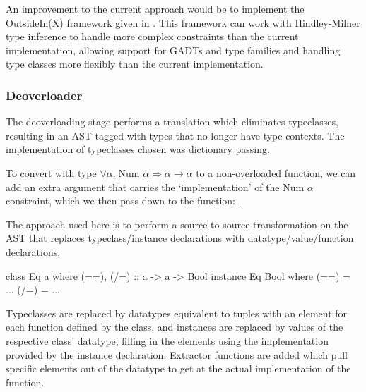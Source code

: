 \documentclass[dissertation.tex]{subfiles}
\begin{document}
{{{            An improvement to the current approach would be to implement the OutsideIn(X) framework given in
            \cite{OutsideIn}. This framework can work with Hindley-Milner type inference to handle more complex
            constraints than the current implementation, allowing support for GADTs and type families and handling type
            classes more flexibly than the current implementation.

        }
        \subsubsection{Deoverloader}\label{sec:deoverloading}
        {

            The deoverloading stage performs a translation which eliminates typeclasses, resulting in an AST tagged with
            types that no longer have type contexts. The implementation of typeclasses chosen was dictionary passing.

            To convert  with type \(\forall \alpha.\; \text{Num }\alpha \Rightarrow
            \alpha\rightarrow\alpha\) to a non-overloaded function, we can add an extra argument that carries the
            `implementation' of the \(\text{Num }\alpha\) constraint, which we then pass down to the \haskell{+}
            function: .


            The approach used here is to perform a source-to-source transformation on the AST that replaces
            typeclass/instance declarations with datatype/value/function declarations.

            \begin{haskellfigure}
            class Eq a where
                (==), (/=) :: a -> a -> Bool
            instance Eq Bool where
                (==) = ...
                (/=) = ...
            \end{haskellfigure}

            Typeclasses are replaced by datatypes equivalent to tuples with an element for each function defined by the
            class, and instances are replaced by values of the respective class' datatype, filling in the elements using
            the implementation provided by the instance declaration. Extractor functions are added which pull specific
            elements out of the datatype to get at the actual implementation of the function.

}}}
\end{document}
